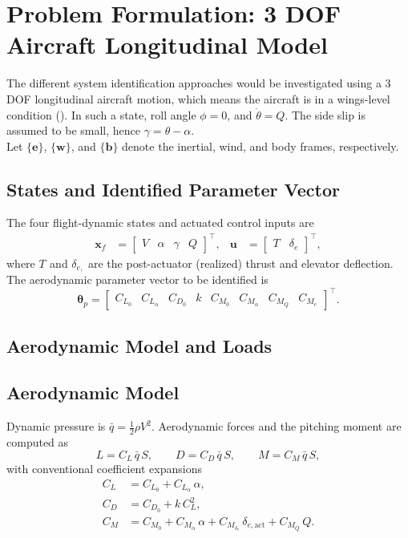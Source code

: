 \documentclass[11pt]{article}
\begin{document}
\section{Problem Formulation: 3 DOF Aircraft Longitudinal Model}\label{sec:prob}
The different system identification approaches would be investigated using a 3 DOF longitudinal aircraft motion, which means the aircraft is in a wings-level condition (\cite{StevensLewis2015}). In such a state, roll angle $\phi = 0$, and $\dot{\theta}=Q$. The side slip is assumed to be small, hence $\gamma = \theta - \alpha$.\\
Let $\{\mathbf{e}\}$, $\{\mathbf{w}\}$, and $\{\mathbf{b}\}$ denote the inertial, wind, and body frames, respectively.
\subsection*{States and Identified Parameter Vector}
The four flight-dynamic states and actuated control inputs are
\begin{align}
    \mathbf{x}_f &= \begin{bmatrix} V & \alpha & \gamma & Q \end{bmatrix}^{\!\top}, &
    \mathbf{u}   &= \begin{bmatrix} T_{\mathrm{}} & \delta_{e} \end{bmatrix}^{\!\top},
\end{align}
where $T_{\mathrm{}}$ and $\delta_{e,\mathrm{}}$ are the post-actuator (realized)
thrust and elevator deflection.
The aerodynamic parameter vector to be identified is
\begin{equation}
    \boldsymbol{\theta}_p =
    \begin{bmatrix}
        C_{L_0} & C_{L_\alpha} & C_{D_0} & k & C_{M_0} & C_{M_\alpha} & C_{M_Q} & C_{M_e}
    \end{bmatrix}^{\!\top}.
\end{equation}
\subsection*{Aerodynamic Model and Loads}
\subsection*{Aerodynamic Model}

Dynamic pressure is $\bar{q} = \tfrac{1}{2}\rho V^{2}$.
Aerodynamic forces and the pitching moment are computed as
\begin{equation}
    L = C_{L}\,\bar{q}\,S,
    \qquad
    D = C_{D}\,\bar{q}\,S,
    \qquad
    M = C_{M}\,\bar{q}\,S,
    \label{eq:aero_loads}
\end{equation}
with conventional coefficient expansions
\begin{align}
    C_{L} &= C_{L_0} + C_{L_\alpha}\,\alpha,
    \label{eq:CL}\\
    C_{D} &= C_{D_0} + k\,C_{L}^{2},
    \label{eq:CD}\\
    C_{M} &= C_{M_0}
           + C_{M_\alpha}\,\alpha
           + C_{M_{\delta_e}}\,\delta_{e,\mathrm{act}}
           + C_{M_Q}\,Q.
    \label{eq:CM}
\end{align}
\end{document}
